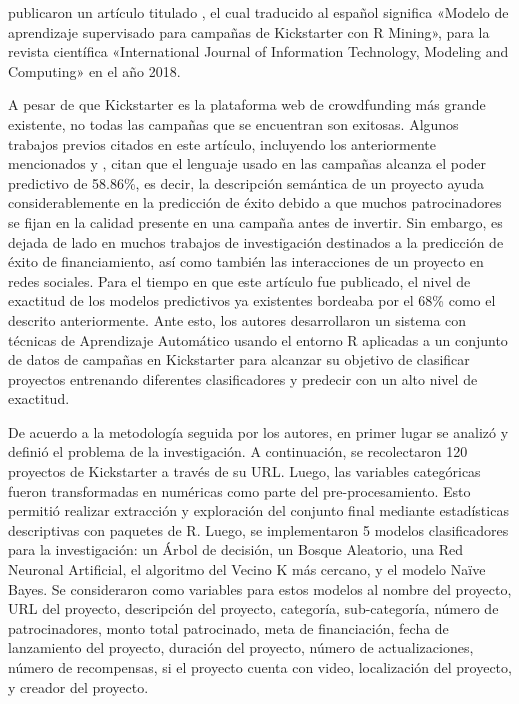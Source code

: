 \clearpage
\cite{pr_kamath2018suplearn} publicaron un artículo titulado , el cual traducido al español significa «Modelo de aprendizaje supervisado para campañas de Kickstarter con R Mining», para la revista científica «International Journal of Information Technology, Modeling and Computing» en el año 2018.

A pesar de que Kickstarter es la plataforma web de crowdfunding más grande existente, no todas las campañas que se encuentran son exitosas. Algunos trabajos previos citados en este artículo, incluyendo los anteriormente mencionados \cite{pr_chen2013kickpredict} y \cite{pr_mitra2014phrases}, citan que el lenguaje usado en las campañas alcanza el poder predictivo de 58.86\%, es decir, la descripción semántica de un proyecto ayuda considerablemente en la predicción de éxito debido a que muchos patrocinadores se fijan en la calidad presente en una campaña antes de invertir.  Sin embargo, es dejada de lado en muchos trabajos de investigación destinados a la predicción de éxito de financiamiento, así como también las interacciones de un proyecto en redes sociales. Para el tiempo en que este artículo fue publicado, el nivel de exactitud de los modelos predictivos ya existentes bordeaba por el 68\% como el descrito anteriormente. Ante esto, los autores desarrollaron un sistema con técnicas de Aprendizaje Automático usando el entorno R aplicadas a un conjunto de datos de campañas en Kickstarter para alcanzar su objetivo de clasificar proyectos entrenando diferentes clasificadores y predecir con un alto nivel de exactitud.

De acuerdo a la metodología seguida por los autores, en primer lugar se analizó y definió el problema de la investigación. A continuación, se recolectaron 120 proyectos de Kickstarter a través de su URL. Luego, las variables categóricas fueron transformadas en numéricas como parte del pre-procesamiento. Esto permitió realizar extracción y exploración del conjunto final mediante estadísticas descriptivas con paquetes de R. Luego, se implementaron 5 modelos clasificadores para la investigación: un Árbol de decisión, un Bosque Aleatorio, una Red Neuronal Artificial, el algoritmo del Vecino K más cercano, y el modelo Naïve Bayes. Se consideraron como variables para estos modelos al nombre del proyecto, URL del proyecto, descripción del proyecto, categoría, sub-categoría, número de patrocinadores, monto total patrocinado, meta de financiación, fecha de lanzamiento del proyecto, duración del proyecto, número de actualizaciones, número de recompensas, si el proyecto cuenta con video, localización del proyecto, y creador del proyecto.


